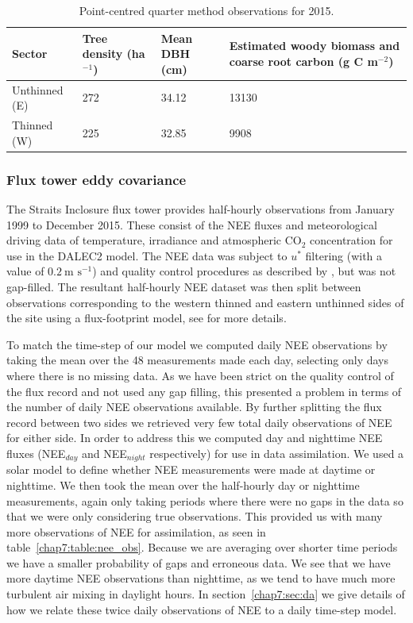 \begin{table}[ht] 
	\caption{Point-centred quarter method observations for 2015.}
\begin{center}
	\begin{tabular}{| l | p{2cm} | p{2cm} | p{4.5cm} |}
	\hline
	Sector & Tree density (ha\(^{-1}\)) & Mean DBH (cm) & Estimated woody biomass and coarse root carbon (g C m\(^{-2}\)) \\ \hline
	Unthinned (E) & 272 & 34.12 & 13130 \\ \hline
	Thinned (W) & 225 & 32.85 & 9908 \\ \hline
	\end{tabular}
	\label{chap7:table:cwoo_obs}
\end{center} 
\end{table}

\subsubsection{Flux tower eddy covariance} \label{chap7:sec:eddycov} 

The Straits Inclosure flux tower provides half-hourly observations from January 1999 to December 2015. These consist of the NEE fluxes and meteorological driving data of temperature, irradiance and atmospheric CO\(_{2}\) concentration for use in the DALEC2 model. The NEE data was subject to \(u^*\) filtering (with a value of \(0.2~\text{m s}^{-1}\)) and quality control procedures as described by \citet{papale2006towards}, but was not gap-filled. The resultant half-hourly NEE dataset was then split between observations corresponding to the western thinned and eastern unthinned sides of the site using a flux-footprint model, see \citet{wilkinson2015effects} for more details.  

To match the time-step of our model we computed daily NEE observations by taking the mean over the 48 measurements made each day, selecting only days where there is no missing data. As we have been strict on the quality control of the flux record and not used any gap filling, this presented a problem in terms of the number of daily NEE observations available. By further splitting the flux record between two sides we retrieved very few total daily observations of NEE for either side. In order to address this we computed day and nighttime NEE fluxes (NEE\(_{day}\) and NEE\(_{night}\) respectively) for use in data assimilation. We used a solar model to define whether NEE measurements were made at daytime or nighttime. We then took the mean over the half-hourly day or nighttime measurements, again only taking periods where there were no gaps in the data so that we were only considering true observations. This provided us with many more observations of NEE for assimilation, as seen in table~\ref{chap7:table:nee_obs}. Because we are averaging over shorter time periods we have a smaller probability of gaps and erroneous data. We see that we have more daytime NEE observations than nighttime, as we tend to have much more turbulent air mixing in daylight hours. In section~\ref{chap7:sec:da} we give details of how we relate these twice daily observations of NEE to a daily time-step model.     

